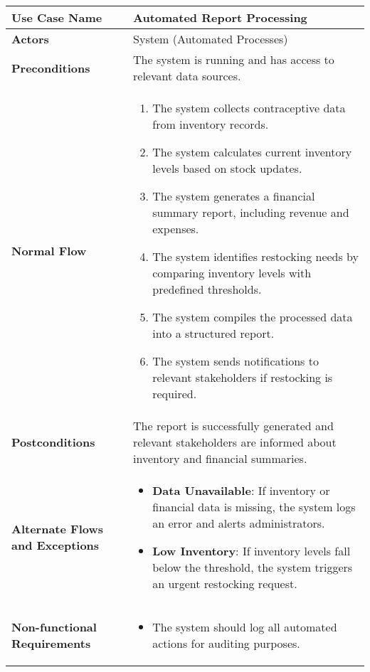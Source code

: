 \documentclass{article}
\begin{document}
\begin{longtable}{|p{4cm}|p{10cm}|}
    \hline
    \textbf{Use Case Name} & Automated Report Processing \\
    \hline
    \textbf{Actors} & System (Automated Processes) \\
    \hline
    \textbf{Preconditions} & The system is running and has access to relevant data sources. \\
    \hline
    \textbf{Normal Flow} & \begin{enumerate}
        \item The system collects contraceptive data from inventory records.
        \item The system calculates current inventory levels based on stock updates.
        \item The system generates a financial summary report, including revenue and expenses.
        \item The system identifies restocking needs by comparing inventory levels with predefined thresholds.
        \item The system compiles the processed data into a structured report.
        \item The system sends notifications to relevant stakeholders if restocking is required.
    \end{enumerate} \\
    \hline
    \textbf{Postconditions} & The report is successfully generated and relevant stakeholders are informed about inventory and financial summaries. \\
    \hline
    \textbf{Alternate Flows and Exceptions} & \begin{itemize}
        \item \textbf{Data Unavailable}: If inventory or financial data is missing, the system logs an error and alerts administrators.
        \item \textbf{Low Inventory}: If inventory levels fall below the threshold, the system triggers an urgent restocking request.
    \end{itemize} \\
    \hline
    \textbf{Non-functional Requirements} & \begin{itemize}
        \item The system should log all automated actions for auditing purposes.
    \end{itemize} \\
    \hline
\end{longtable}

\end{document}
